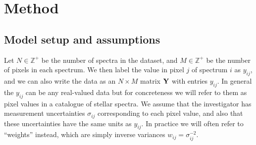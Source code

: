 \documentclass[onecolumn,floatfix]{aastex631}
\begin{document}

\section{Method} \label{sec:methods}


\subsection{Model setup and assumptions} \label{sec:assumptions}

Let $N \in \mathbb{Z}^+$ be the number of spectra in the dataset, and $M\in\mathbb{Z}^+$ be the number of pixels in each spectrum.
We then label the value in pixel $j$ of spectrum $i$ as $y_{ij}$, and we can also write the data as an $N \times M$ matrix ${\bf Y}$ with entries $y_{ij}$.
In general the $y_{ij}$ can be any real-valued data but for concreteness we will refer to them as pixel values in a catalogue of stellar spectra.
We assume that the investigator has measurement uncertainties $\sigma_{ij}$ corresponding to each pixel value, and also that these uncertainties have the same units as $y_{ij}$.
In practice we will often refer to ``weights'' instead, which are simply inverse variances $w_{ij} = \sigma_{ij}^{-2}$.
\end{document}
